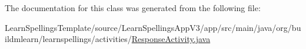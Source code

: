 The documentation for this class was generated from the following file\+:\begin{DoxyCompactItemize}
\item 
Learn\+Spellings\+Template/source/\+Learn\+Spellings\+App\+V3/app/src/main/java/org/buildmlearn/learnspellings/activities/\hyperlink{ResponseActivity_8java}{Response\+Activity.\+java}\end{DoxyCompactItemize}
